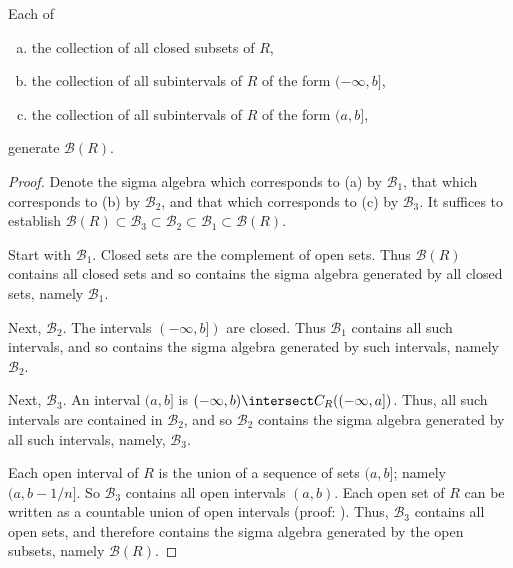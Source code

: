 \begin{prop}
\label{borelalternategenerations}

Each of
\begin{enumerate}[(a)]
  \item
  the collection of all closed subsets of $R$,

  \item
  the collection of all subintervals of $R$ of the form $(-\infty, b]$,

  \item
  the collection of all subintervals of $R$ of the form $(a, b]$,
\end{enumerate}
generate $\mathcal{B}(R)$.

\begin{proof}

Denote the sigma algebra
which corresponds to (a) by
$\mathcal{B}_1$, that which corresponds
to (b) by $\mathcal{B}_2$, and that which
corresponds to (c) by $\mathcal{B}_3$.
It suffices to establish
$\mathcal{B}(R) \subset \mathcal{B}_3
\subset \mathcal{B}_2 \subset \mathcal{B}_1
\subset \mathcal{B}(R)$.

Start with $\mathcal{B}_1$.
Closed sets are the complement of open sets.
Thus $\mathcal{B}(R)$ contains all closed
sets and so contains the sigma algebra
generated by all closed sets, namely $\mathcal{B}_1$.

Next, $\mathcal{B}_2$.
The intervals $(-\infty, b])$ are closed.
Thus $\mathcal{B}_1$ contains all such intervals,
and so contains the sigma algebra generated by such
intervals, namely $\mathcal{B}_2$.

Next, $\mathcal{B}_3$.
An interval $(a, b]$ is
$(-\infty, b) \intersect C_R((-\infty, a])$.
Thus, all such intervals are contained in
$\mathcal{B}_2$, and so $\mathcal{B}_2$ contains
the sigma algebra generated by all such intervals,
namely, $\mathcal{B}_3$.

Each open interval of $R$ is the union
of a sequence of sets $(a, b]$; namely $(a, b-1/n]$.
So $\mathcal{B}_3$ contains all open intervals $(a, b)$.
Each open set of $R$ can be written as a countable
union of open intervals (proof: ).
Thus, $\mathcal{B}_3$ contains all open sets,
and therefore contains the sigma algebra
generated by the open subsets, namely $\mathcal{B}(R)$.
  \end{proof}
\end{prop}

